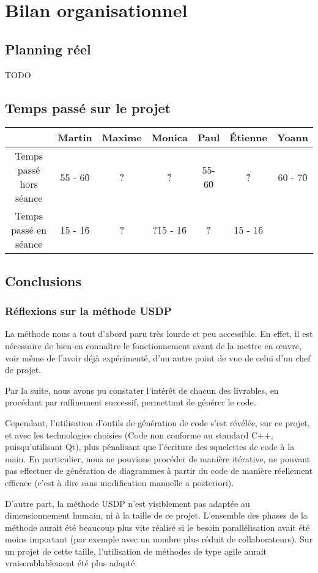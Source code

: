 \section{Bilan organisationnel}
\subsection{Planning réel}
{\Huge TODO}
\subsection{Temps passé sur le projet} 
\begin{tabular}{|c|c|c|c|c|c|c|}
\hline
& Martin & Maxime & Monica & Paul & Étienne & Yoann \\
\hline
Temps passé hors séance & 55 - 60\h & ?\h & ?\h & 55-60\h & ?\h & 60 - 70\h \\
Temps passé en séance & 15 - 16\h & ?\h & ?\h 15 - 16\h & ?\h & 15 - 16\h \\
\hline
\end{tabular}

\subsection{Conclusions}
\subsubsection{Réflexions sur la méthode USDP}
La méthode nous a tout d'abord paru très lourde et peu accessible. En effet, il est nécessaire de bien en connaître le fonctionnement avant de la mettre en \oe uvre, voir même de l'avoir déjà expérimenté, d'un autre point de vue de celui d'un chef de projet.

Par la suite, nous avons pu constater l'intérêt de chacun des livrables, en procédant par raffinement successif, permettant de générer le code.

Cependant, l'utilisation d'outils de génération de code s'est révélée, sur ce projet, et avec les technologies choisies (Code non conforme au standard C++, puisqu'utilisant Qt), plus pénalisant que l'écriture des squelettes de code à la main. En particulier, nous ne pouvions procéder de manière itérative, ne pouvant pas effectuer de génération de diagrammes à partir du code de manière réellement efficace (c'est à dire sans modification manuelle a posteriori).

D'autre part, la méthode USDP n'est visiblement pas adaptée au dimensionnement humain, ni à la taille de ce projet. L'ensemble des phases de la méthode aurait été beaucoup plus vite réalisé si le besoin parallélisation avait été moins important (par exemple avec un nombre plus réduit de collaborateurs). Sur un projet de cette taille, l'utilisation de méthodes de type agile aurait vraisemblablement été plus adapté.


